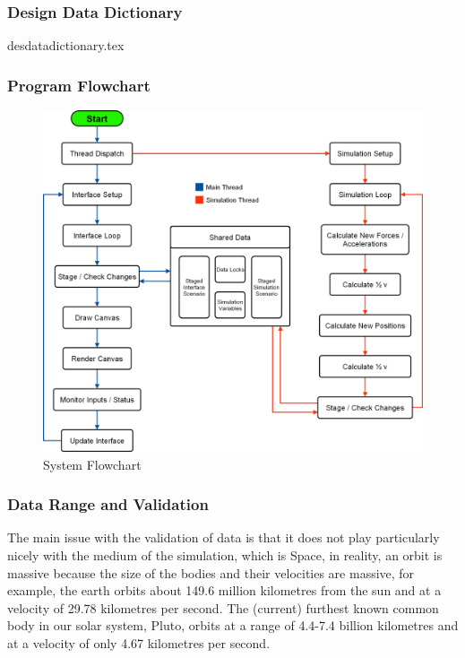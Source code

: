 \subsubsection{Design Data Dictionary}
{desdatadictionary.tex}

\pagebreak
\subsubsection{Program Flowchart}
\begin{figure}[!ht]
  \centering
  \includegraphics[width=\textwidth]{img/flowchart.png}
  \caption{System Flowchart}
\end{figure}

\pagebreak
\subsubsection{Data Range and Validation}
The main issue with the validation of data is that it does not play particularly nicely with the medium of the simulation, which is Space, in reality, an orbit is massive because the size of the bodies and their velocities are massive, for example, the earth orbits about 149.6 million kilometres from the sun and at a velocity of 29.78 kilometres per second. The (current) furthest known common body in our solar system, Pluto, orbits at a range of 4.4-7.4 billion kilometres and at a velocity of only 4.67 kilometres per second.

